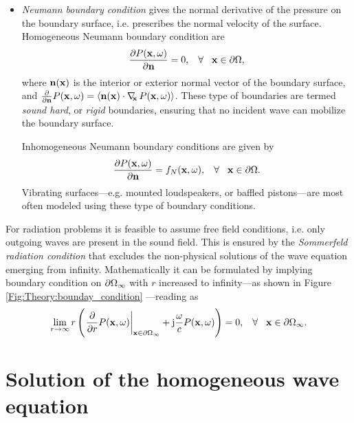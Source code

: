 \begin{itemize}
\item \emph{Neumann boundary condition} gives the normal derivative of the pressure on the boundary surface, i.e. prescribes the normal velocity of the surface.
Homogeneous Neumann boundary condition are
\begin{equation}
\frac{\partial P(\mathbf{x},\omega)}{\partial \mathbf{n}} = 0, \hspace{3mm} \forall \hspace{3mm}  \mathbf{x} \in \partial \Omega,
\end{equation}
where $ \mathbf{n}(\mathbf{x}) $ is the interior or exterior normal vector of the boundary surface, and $\frac{\partial}{\partial \mathbf{n}} P(\mathbf{x},\omega) = \left< \mathbf{n}(\mathbf{x}) \cdot \nabla_{\!\!\mathbf{x}}\, P(\mathbf{x},\omega) \right>$.
These type of boundaries are termed \emph{sound hard}, or \emph{rigid} boundaries, ensuring that no incident wave can mobilize the boundary surface.

Inhomogeneous Neumann boundary conditions are given by
\begin{equation}
\frac{\partial P(\mathbf{x},\omega)}{\partial \mathbf{n}} = f_N(\mathbf{x},\omega), \hspace{3mm} \forall \hspace{3mm}  \mathbf{x} \in \partial \Omega.
\end{equation}
Vibrating surfaces---e.g. mounted loudspeakers, or baffled pistons---are most often modeled using these type of boundary conditions.
\end{itemize}

For radiation problems it is feasible to assume free field conditions, i.e. only outgoing waves are present in the sound field. 
This is ensured by the \emph{Sommerfeld radiation condition} that excludes the non-physical solutions of the wave equation emerging from infinity.
Mathematically it can be formulated by implying boundary condition on $\partial \Omega_{\infty}$ with $r$ increased to infinity---as shown in Figure \ref{Fig:Theory:bounday_condition} \cite{Schot1992:Eighty_years, Williams1999}---reading as
\begin{equation}
\lim_{r \rightarrow \infty} r \left( \left. \frac{\partial}{\partial r}P(\mathbf{x},\omega)\right|_{\mathbf{x} \in \partial \Omega_{\infty}} +\mathrm{j} \frac{\omega}{c}P(\mathbf{x},\omega) \right) = 0, \hspace{3mm} \forall \hspace{3mm} \mathbf{x} \in \partial \Omega_{\infty}.
\label{Eq:Theory:Sommerfeld_radiation_condition}
\end{equation}


\section{Solution of the homogeneous wave equation}


